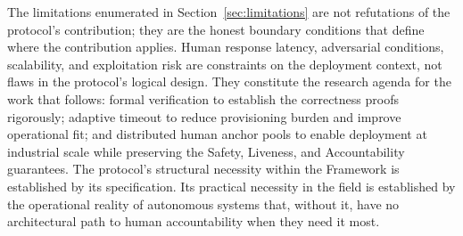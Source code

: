 The limitations enumerated in Section~\ref{sec:limitations} are not refutations of the protocol's contribution; they are the honest boundary conditions that define where the contribution applies. Human response latency, adversarial conditions, scalability, and exploitation risk are constraints on the deployment context, not flaws in the protocol's logical design. They constitute the research agenda for the work that follows: formal verification to establish the correctness proofs rigorously; adaptive timeout to reduce provisioning burden and improve operational fit; and distributed human anchor pools to enable deployment at industrial scale while preserving the Safety, Liveness, and Accountability guarantees. The protocol's structural necessity within the \bxthree{} Framework is established by its specification. Its practical necessity in the field is established by the operational reality of autonomous systems that, without it, have no architectural path to human accountability when they need it most.
